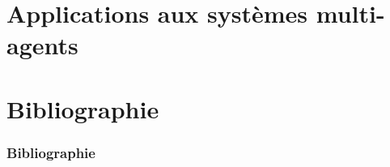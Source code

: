\documentclass[utf8]{beamer}
\begin{document}
\section{Applications aux systèmes multi-agents}
\frame{\sectionpage}

\section{Bibliographie}

%
\begin{frame}
\frametitle{Bibliographie}

\end{frame}
\end{document}
